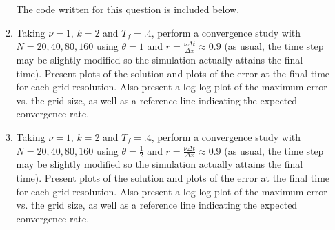 \documentclass[11pt]{article}
\newcommand{\dx}{\Delta x}
\newcommand{\dt}{\Delta t}
\begin{document}
\begin{enumerate}
\begin{enumerate}
      The code written for this question is included below. 
      
      
      \item {\color{blue}Taking} $\nu=1$, $k=2$ {\color{blue}and} $T_f=.4${\color{blue}, perform a convergence study with }$N=20, 40, 80, 160$ {\color{blue} using} $\theta=1$ {\color{blue} and }$r=\frac{\nu\dt}{\dx}\approx 0.9$ {\color{blue} (as usual, the time step may be slightly modified so the simulation actually attains the final time). Present plots of the solution and plots of the error at the final time for each grid resolution. Also present a log-log plot of the maximum error vs. the grid size, as well as a reference line indicating the expected convergence rate.}
      \item {\color{blue}Taking} $\nu=1$, $k=2$ {\color{blue}and} $T_f=.4${\color{blue}, perform a convergence study with }$N=20, 40, 80, 160$ {\color{blue} using} $\theta=\frac{1}{2}$ {\color{blue} and }$r=\frac{\nu\dt}{\dx}\approx 0.9$ {\color{blue} (as usual, the time step may be slightly modified so the simulation actually attains the final time). Present plots of the solution and plots of the error at the final time for each grid resolution. Also present a log-log plot of the maximum error vs. the grid size, as well as a reference line indicating the expected convergence rate.} \\
      

\end{enumerate}
\end{enumerate}
\end{document}
